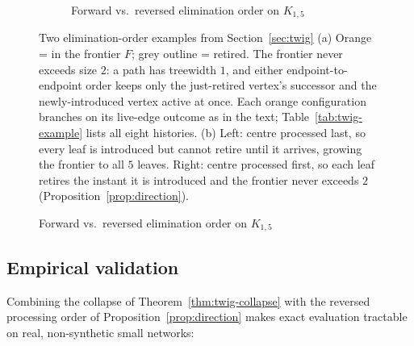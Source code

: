 \documentclass[ijoc,sglanonrev]{informs4}
\begin{document}
\begin{figure}[h]
{\begin{subfigure}[t]{0.5\textwidth}
{}
\caption{Forward vs.\ reversed elimination order on $K_{1,5}$}
\label{fig:star-direction}
\end{subfigure}
}
{Two elimination-order examples from Section~\ref{sec:twig}}
{(a) Orange = in the frontier $F$; grey outline = retired. The frontier
never exceeds size $2$: a path has treewidth $1$, and either
endpoint-to-endpoint order keeps only the just-retired vertex's successor
and the newly-introduced vertex active at once. Each orange configuration
branches on its live-edge outcome as in the text; Table~\ref{tab:twig-example}
lists all eight histories. (b) Left: centre processed last, so every leaf
is introduced but cannot retire until it arrives, growing the frontier to
all $5$ leaves. Right: centre processed first, so each leaf retires the
instant it is introduced and the frontier never exceeds $2$
(Proposition~\ref{prop:direction}).}
\end{figure}

\subsection{Empirical validation}\label{sec:twig-empirical}

Combining the collapse of Theorem~\ref{thm:twig-collapse} with the reversed
processing order of Proposition~\ref{prop:direction} makes exact evaluation
tractable on real, non-synthetic small networks:
\end{document}
